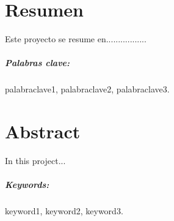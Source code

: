 \chapter{Resumen}

Este proyecto se resume en.................

\paragraph{Palabras clave:} palabraclave1, palabraclave2, palabraclave3.

\chapter{Abstract}

In this project...

\paragraph{Keywords:} keyword1, keyword2, keyword3.